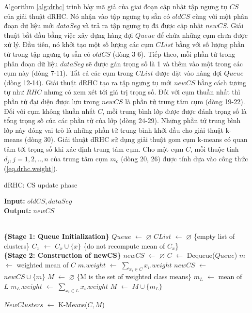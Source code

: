 \documentclass[13pt,oneside]{scrbook}
\newcommand*\Let[2]{\State #1 $\gets$ #2}
\let\emptyset\varnothing
\begin{document}
Algorithm \ref{alg:drhc} trình bày mã giả của giai đoạn cập nhật tập ngưng tụ $CS$ của giải thuật dRHC.
Nó nhận vào tập ngưng tụ sẵn có $oldCS$ cùng với một phân đoạn dữ liệu mới $dataSeg$ và trả ra tập ngưng tụ đã được cập nhật $newCS$.
Giải thuật bắt đầu bằng việc xây dựng hàng đợi $Queue$ để chứa những cụm chưa được xử lý.
Đầu tiên, nó khởi tạo một số lượng các cụm $CList$ bằng với số lượng phần tử trong tập ngưng tụ sẵn có $oldCS$ (dòng 3-6).
Tiếp theo, mỗi phần tử trong phân đoạn dữ liệu $dataSeg$ sẽ được gán trọng số là 1 và thêm vào một trong các cụm này (dòng 7-11).
Tất cả các cụm trong $CList$ được đặt vào hàng đợi $Queue$ (dòng 12-14).
Giải thuật dRHC tạo ra tập ngưng tụ mới $newCS$ bằng cách tương tự như $RHC$ nhưng có xem xét tới giá trị trọng số.
Đối với cụm thuần nhất thì phần tử đại diện được lưu trong $newCS$ là phần tử trung tâm cụm (dòng 19-22).
Đối với cụm không thuần nhất $C$, mỗi trung bình lớp được được đánh trọng số là tổng trọng số của các phần tử của lớp (dòng 24-29).
Những phần tử trung bình lớp này đóng vai trò là những phần tử trung bình khởi đầu cho giải thuật k-means (dòng 30). 
Giải thuật dRHC sử dụng giải thuật gom cụm k-means có quan tâm tới trọng số khi xác định trung tâm cụm.
Cho một cụm $C$, mỗi thuộc tính $d_j, j=1,2,..,n$ của trung tâm cụm $m_c$ (dòng 20, 26) được tính dựa vào công thức (\ref{eq.drhc.weight}). 
\begin{algorithm}
  \caption{dRHC: CS update phase 
   \label{alg:drhc}}
    \textbf{Input:} $oldCS, dataSeg$\\
    \textbf{Output:} $newCS$
  \begin{algorithmic}[1]
    \Statex
      \\\textbf{\{Stage 1: Queue Initialization\}}
      \Let{$Queue$}{$\emptyset$}
      \Let{$C List$}{$\emptyset$} \{empty list of clusters\}
      \EndFor
          \Let{$C_x$}{$C_x \cup \{x\}$} \{do not recompute mean of $C_x$\}
      \EndFor
      \EndFor
      \\\textbf{\{Stage 2: Construction of newCS\}}
      \Let{$newCS$}{$\emptyset$}
      \Repeat
          \Let{$C$}{Dequeue($Queue$)}
          \Let{$m$}{weighted mean of $C$}
          \Let{$m.weight$}{$\sum\limits_{{x_i} \in C} {{x_i}.weight} $}
          \Let{$newCS$}{$newCS \cup \{m\}$}
      \Else
          \Let{$M$}{$\emptyset$} \{M is the set of weighted class means\}
              \Let{$m_L$}{mean of $L$}
              \Let{$m_L.weight$}{$\sum\limits_{{x_i} \in L} {{x_i}.weight} $}
              \Let{$M$}{$M \cup \{m_L\}$}
         
          \EndFor
          \Let{$NewClusters$}{K-Means($C,M$)}
          \EndFor
      \EndIf
      \State {}
  \end{algorithmic}
\end{algorithm}
\newpage
\end{document}
